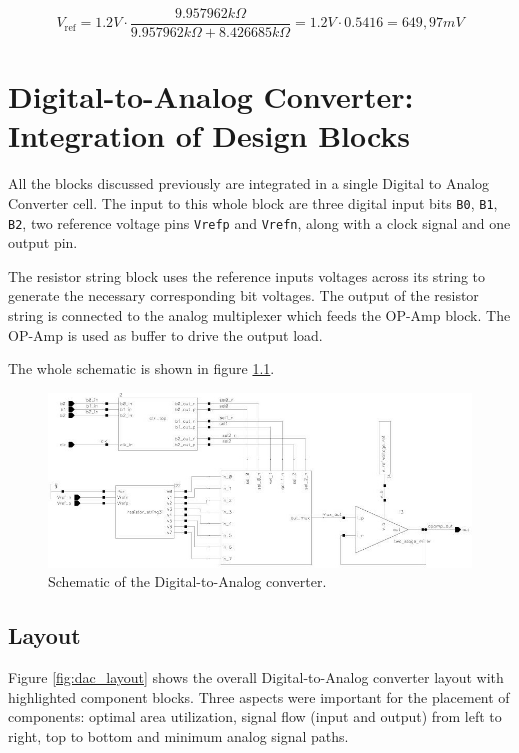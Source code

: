 \documentclass[parskip,oneside,colorbacktitle,10pt,accentcolor=tud1b,table]{tudreport}
\begin{document}
{\begin{equation}
V_\text{ref} = 1.2 V \cdot \frac{9.957962 k\Omega}{9.957962 k\Omega + 8.426685 k\Omega} = 1.2 V \cdot 0.5416 = 649,97 mV
\end{equation}

\vspace{6cm}

\chapter{Digital-to-Analog Converter: Integration of Design Blocks}
All the blocks discussed previously are integrated in a single Digital to Analog Converter cell. The input to this whole block are three digital input bits \texttt{B0}, \texttt{B1}, \texttt{B2}, two reference voltage pins \texttt{Vrefp} and \texttt{Vrefn}, along with a clock signal and one output pin. 

The resistor string block uses the reference inputs voltages across its string to generate the necessary corresponding bit voltages. The output of the resistor string is connected to the analog multiplexer which feeds the OP-Amp block. The OP-Amp is used as buffer to drive the output load. 

The whole schematic is shown in figure \ref{fig:dac_schematic}.

\begin{figure}[H]
	\begin{center}
		\includegraphics[scale=0.5]{top_schematic}
		 \caption{Schematic of the Digital-to-Analog converter.}
		 \label{fig:dac_schematic}
	\end{center}
\end{figure}

\section{Layout}

Figure \ref{fig:dac_layout} shows the overall Digital-to-Analog converter layout with highlighted component blocks. Three aspects were important for the placement of components: optimal area utilization, signal flow (input and output) from left to right, top to bottom and minimum analog signal paths.

}
\end{document}
